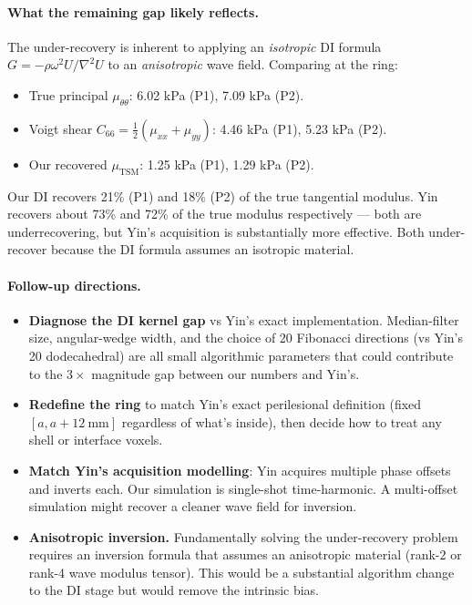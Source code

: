 \documentclass[11pt,letterpaper]{article}
\begin{document}
\paragraph{What the remaining gap likely reflects.}
The under-recovery is inherent to applying an \emph{isotropic}
DI formula $G = -\rho\omega^{2}U/\nabla^{2} U$ to an
\emph{anisotropic} wave field. Comparing at the ring:
\begin{itemize}
\item True principal $\mu_{\theta\theta}$: 6.02 kPa (P1), 7.09 kPa (P2).
\item Voigt shear $C_{66} = \tfrac{1}{2}(\mu_{xx}+\mu_{yy})$: 4.46 kPa (P1), 5.23 kPa (P2).
\item Our recovered $\mu_{\mathrm{TSM}}$: 1.25 kPa (P1), 1.29 kPa (P2).
\end{itemize}
Our DI recovers 21\% (P1) and 18\% (P2) of the true tangential
modulus. Yin recovers about 73\% and 72\% of the true modulus
respectively --- both are underrecovering, but Yin's acquisition is
substantially more effective. Both under-recover because the DI
formula assumes an isotropic material.

\paragraph{Follow-up directions.}
\begin{itemize}
\item \textbf{Diagnose the DI kernel gap} vs Yin's exact
      implementation. Median-filter size, angular-wedge width, and the
      choice of 20 Fibonacci directions (vs Yin's 20 dodecahedral) are
      all small algorithmic parameters that could contribute to the
      $3\times$ magnitude gap between our numbers and Yin's.
\item \textbf{Redefine the ring} to match Yin's exact perilesional
      definition (fixed $[a, a + 12~\text{mm}]$ regardless of what's
      inside), then decide how to treat any shell or interface voxels.
\item \textbf{Match Yin's acquisition modelling}: Yin acquires multiple
      phase offsets and inverts each. Our simulation is single-shot
      time-harmonic. A multi-offset simulation might recover a cleaner
      wave field for inversion.
\item \textbf{Anisotropic inversion.} Fundamentally solving the
      under-recovery problem requires an inversion formula that assumes
      an anisotropic material (rank-2 or rank-4 wave modulus tensor).
      This would be a substantial algorithm change to the DI stage but
      would remove the intrinsic bias.
\end{itemize}
\end{document}
